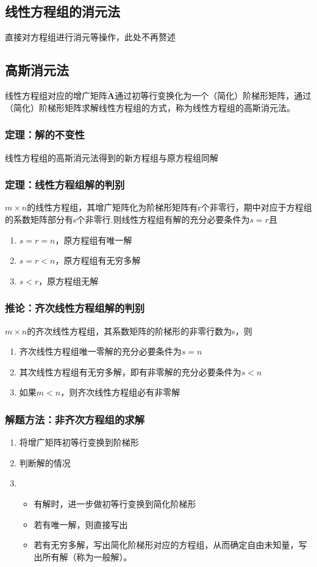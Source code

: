 \documentclass[UTF-8,a4paper]{ctexart}
\begin{document}
\subsection{线性方程组的消元法} 直接对方程组进行消元等操作，此处不再赘述
\subsection{高斯消元法} 线性方程组对应的增广矩阵\(\mathbf {\tilde A}\)通过初等行变换化为一个（简化）阶梯形矩阵，通过（简化）阶梯形矩阵求解线性方程组的方式，称为线性方程组的高斯消元法。
\subsubsection{定理：解的不变性} 线性方程组的高斯消元法得到的新方程组与原方程组同解
\subsubsection{定理：线性方程组解的判别} \(m \times n\)的线性方程组，其增广矩阵化为阶梯形矩阵有r个非零行，期中对应于方程组的系数矩阵部分有s个非零行.则线性方程组有解的充分必要条件为\(s=r\)且
\begin{enumerate}
    \item \(s=r=n\)，原方程组有唯一解
    \item \(s=r<n\)，原方程组有无穷多解
    \item \(s<r\)，原方程组无解
\end{enumerate}
\subsubsection{推论：齐次线性方程组解的判别} \(m \times n\)的齐次线性方程组，其系数矩阵的阶梯形的非零行数为s，则
\begin{enumerate}
    \item 齐次线性方程组唯一零解的充分必要条件为\(s=n\)
    \item 其次线性方程组有无穷多解，即有非零解的充分必要条件为\(s<n\)
    \item 如果\(m<n\)，则齐次线性方程组必有非零解
\end{enumerate}
\subsubsection{解题方法：非齐次方程组的求解}
\begin{enumerate}
    \item 将增广矩阵初等行变换到阶梯形
    \item 判断解的情况
    \item {\begin{itemize}
        \item 有解时，进一步做初等行变换到简化阶梯形
        \item 若有唯一解，则直接写出
        \item 若有无穷多解，写出简化阶梯形对应的方程组，从而确定自由未知量，写出所有解（称为一般解）。
        \end{itemize}}
\end{enumerate}
\end{document}
